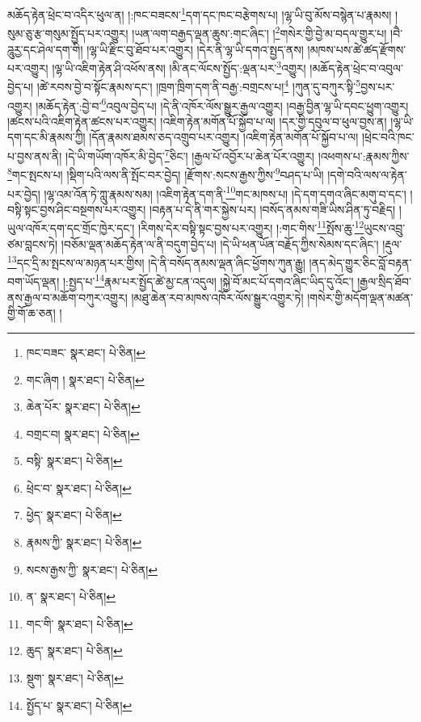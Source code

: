 མཆོད་རྟེན་ཕྲེང་བ་འདིར་ཕུལ་ན། །:ཁང་བཟངས་\footnote{ཁང་བཟང་  སྣར་ཐང་།  པེ་ཅིན། }དག་དང་ཁང་བརྩེགས་པ། །ལྷ་ཡི་བུ་མོས་བསྙེན་པ་རྣམས། །སུམ་ཅུ་རྩ་གསུམ་སྤྱོད་པར་འགྱུར། །ཡན་ལག་བརྒྱད་ལྡན་ཆུས་:གང་ཞིང་། །\footnote{གང་ཞིག །  སྣར་ཐང་།  པེ་ཅིན། }གསེར་གྱི་བྱེ་མ་བདལ་གྱུར་པ། །བཻ་ཌཱུརྱ་དང་ཤེལ་དག་གི། །ལྷ་ཡི་རྫིང་བུ་ཐོབ་པར་འགྱུར། །དེར་ནི་ལྷ་ཡི་དགའ་སྤྱད་ནས། །མཁས་པས་ཚེ་ཚད་རྫོགས་པར་འགྱུར། །ལྷ་ཡི་འཇིག་རྟེན་ཤི་འཕོས་ནས། །མི་ནང་ལོངས་སྤྱོད་:ལྡན་པར་\footnote{ཆེན་པོར་  སྣར་ཐང་།  པེ་ཅིན། }འགྱུར། །མཆོད་རྟེན་ཕྲེང་བ་འབུལ་བྱེད་པ། །ཚེ་རབས་བྱེ་བ་སྟོང་རྣམས་དང་། །ཁྲག་ཁྲིག་དག་ནི་བརྒྱ་:བགྲངས་པ།\footnote{བགྲང་བ།  སྣར་ཐང་།  པེ་ཅིན། } །ཀུན་དུ་བཀུར་སྟི་\footnote{བསྟི་  སྣར་ཐང་།  པེ་ཅིན། }བྱས་པར་འགྱུར། །མཆོད་རྟེན་:བྱེ་བ་\footnote{ཕྲེང་བ་  སྣར་ཐང་།  པེ་ཅིན། }འབུལ་བྱེད་པ། །དེ་ནི་འཁོར་ལོས་སྒྱུར་རྒྱལ་འགྱུར། །བརྒྱ་བྱིན་ལྷ་ཡི་དབང་ཕྱུག་འགྱུར། །ཚངས་པའི་འཇིག་རྟེན་ཚངས་པར་འགྱུར། །འཇིག་རྟེན་མགོན་པོ་སྐྱོབ་པ་ལ། །དར་གྱི་དབུལ་བ་ཕུལ་བྱས་ན། །ལྷ་ཡི་དག་དང་མི་རྣམས་ཀྱི། །དོན་རྣམས་ཐམས་ཅད་འགྲུབ་པར་འགྱུར། །འཇིག་རྟེན་མགོན་པོ་སྐྱོབ་པ་ལ། །ཕྲེང་བའི་ཁང་པ་བྱས་ནས་ནི། །དེ་ཡི་གཡོག་འཁོར་མི་བྱེད་\footnote{ཕྱེད་  སྣར་ཐང་།  པེ་ཅིན། }ཅིང་། །རྒྱལ་པོ་འབྱོར་པ་ཆེན་པོར་འགྱུར། །འཕགས་པ་:རྣམས་ཀྱིས་\footnote{རྣམས་ཀྱི་  སྣར་ཐང་།  པེ་ཅིན། }གང་སྤངས་པ། །སྡིག་པའི་ལས་ནི་སྤོང་བར་བྱེད། །རྫོགས་:སངས་རྒྱས་ཀྱིས་\footnote{སངས་རྒྱས་ཀྱི་  སྣར་ཐང་།  པེ་ཅིན། }བཤད་པ་ཡི། །དགེ་བའི་ལས་ལ་རྟེན་པར་བྱེད། །ལྷ་འམ་འོན་ཏེ་ཀླུ་རྣམས་སམ། །འཇིག་རྟེན་དག་ནི་\footnote{ན་  སྣར་ཐང་།  པེ་ཅིན། }གང་མཁས་པ། །དེ་དག་དགའ་ཞིང་མགུ་བ་དང་། །བསྟི་སྟང་བྱས་ཤིང་བསྔགས་པར་འགྱུར། །བརྟན་པ་དེ་ནི་གར་སྐྱེས་པར། །བསོད་ནམས་གཟི་ཡིས་ཤིན་ཏུ་བརྗིད། །ཡུལ་འཁོར་དག་དང་གྲོང་ཁྱེར་དང་། །རིགས་དེར་བསྟི་སྟང་བྱས་པར་འགྱུར། །:གང་གིས་\footnote{གང་གི་  སྣར་ཐང་།  པེ་ཅིན། }སྤོས་ཆུ་\footnote{ཆུད་  སྣར་ཐང་།  པེ་ཅིན། }ཡུངས་འབྲུ་ཙམ་བླངས་ཏེ། །བཅོམ་ལྡན་མཆོད་རྟེན་ལ་ནི་བདུག་བྱེད་པ། །དེ་ཡི་ཕན་ཡོན་བརྗོད་ཀྱིས་སེམས་དང་ཞིང་། །རྡུལ་\footnote{སྡུག་  སྣར་ཐང་།  པེ་ཅིན། }དང་དྲི་མ་སྤངས་ལ་མཉན་པར་གྱིས། །དེ་ནི་བསོད་ནམས་ལྡན་ཞིང་ཕྱོགས་ཀུན་རྒྱུ། །ནད་མེད་གྱུར་ཅིང་བློ་བརྟན་བག་ཡོད་ལྡན། །:སྤྱད་པ་\footnote{སྤྱོད་པ་  སྣར་ཐང་།  པེ་ཅིན། }རྣམ་པར་སྤྱོད་ཚེ་མྱ་ངན་འདུལ། །སྐྱེ་བོ་མང་པོ་དགའ་ཞིང་ཡིད་དུ་འོང་། །རྒྱལ་སྲིད་ཐོབ་ནས་རྒྱལ་བ་མཆོག་བཀུར་འགྱུར། །མཐུ་ཆེན་རབ་མཁས་འཁོར་ལོས་སྒྱུར་འགྱུར་ཏེ། །གསེར་གྱི་མདོག་ལྡན་མཚན་གྱི་གོ་ཆ་ཅན། །
